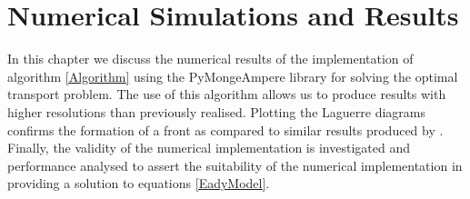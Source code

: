 \chapter{Numerical Simulations and Results \label{results}}
In this chapter we discuss the numerical results of the implementation of algorithm \ref{Algorithm} using the PyMongeAmpere library \cite{Merigot2017a} for solving the optimal transport problem. The use of this algorithm allows us to produce results with higher resolutions than previously realised. Plotting the Laguerre diagrams confirms the formation of a front as compared to similar results produced by \cite{Nakamura1994,Cullen1993}. Finally, the validity of the numerical implementation is investigated and performance analysed to assert the suitability of the numerical implementation in providing a solution to equations \ref{EadyModel}.
